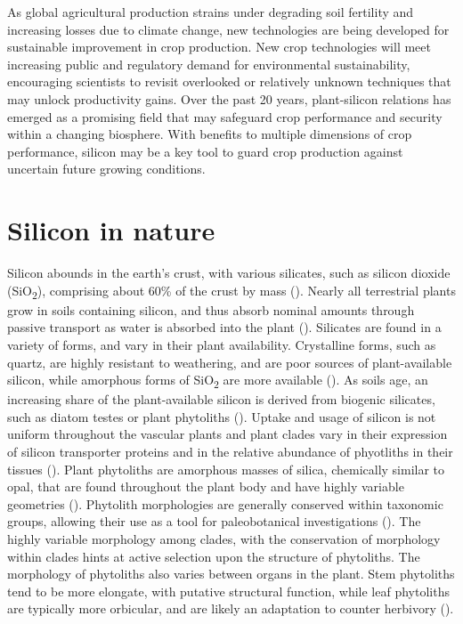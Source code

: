 \documentclass[12pt, letterpaper, ]{report}
\begin{document}
As global agricultural production strains under degrading soil fertility and increasing losses due to climate change, new technologies are being developed for sustainable improvement in crop production. New crop technologies will meet increasing public and regulatory demand for environmental sustainability, encouraging scientists to revisit overlooked or relatively unknown techniques that may unlock productivity gains. Over the past 20 years, plant-silicon relations has emerged as a promising field that may safeguard crop performance and security within a changing biosphere. With benefits to multiple dimensions of crop performance, silicon may be a key tool to guard crop production against uncertain future growing conditions. 

\section{Silicon in nature}

Silicon abounds in the earth’s crust, with various silicates, such as silicon dioxide (SiO\textsubscript{2}), comprising about 60\% of the crust by mass (\cite{holland_41_2014}). Nearly all terrestrial plants grow in soils containing silicon, and thus absorb nominal amounts through passive transport as water is absorbed into the plant (\cite{debona_silicons_2017}). Silicates are found in a variety of forms, and vary in their plant availability. Crystalline forms, such as quartz, are highly resistant to weathering, and are poor sources of plant-available silicon, while amorphous forms of SiO\textsubscript{2} are more available (\cite{fraysse_surface_2009}). As soils age, an increasing share of the plant-available silicon is derived from biogenic silicates, such as diatom testes or plant phytoliths (\cite{de_tombeur_plants_2020}). Uptake and usage of silicon is not uniform throughout the vascular plants and plant clades vary in their expression of silicon transporter proteins and in the relative abundance of phyotliths in their tissues (\cite{ma_chapter_2001}). Plant phytoliths are amorphous masses of silica, chemically similar to opal, that are found throughout the plant body and have highly variable geometries (\cite{piperno_phytoliths_2006}). Phytolith morphologies are generally conserved within taxonomic groups, allowing their use as a tool for paleobotanical investigations (\cite{piperno_phytoliths_2006}). The highly variable morphology among clades, with the conservation of morphology within clades hints at active selection upon the structure of phytoliths. The morphology of phytoliths also varies between organs in the plant. Stem phytoliths tend to be more elongate, with putative structural function, while leaf phytoliths are typically more orbicular, and are likely an adaptation to counter herbivory (\cite{parr_phytolith_2011,stromberg_functions_2016}).
\end{document}
